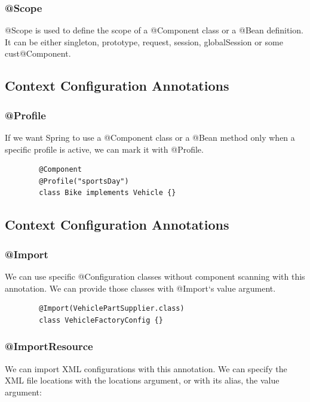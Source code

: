 \documentclass{scrartcl}
\begin{document}
\subsubsection{@Scope}

    @Scope is used to define the scope of a @Component class or a @Bean definition. It can be either singleton, prototype, request, session, globalSession or some cust@Component.

\subsection{Context Configuration Annotations}
\subsubsection{@Profile}

    If we want Spring to use a @Component class or a @Bean method only when a specific profile is active, we can mark it with @Profile.

    \begin{lstlisting}
        @Component
        @Profile("sportsDay")
        class Bike implements Vehicle {}
    \end{lstlisting}

\subsection{Context Configuration Annotations}
\subsubsection{@Import}

    We can use specific @Configuration classes without component scanning with this annotation. We can provide those classes with @Import‘s value argument.

    \begin{lstlisting}
        @Import(VehiclePartSupplier.class)
        class VehicleFactoryConfig {}
    \end{lstlisting}

\subsubsection{@ImportResource}

    We can import XML configurations with this annotation. We can specify the XML file locations with the locations argument, or with its alias, the value argument:
\end{document}
